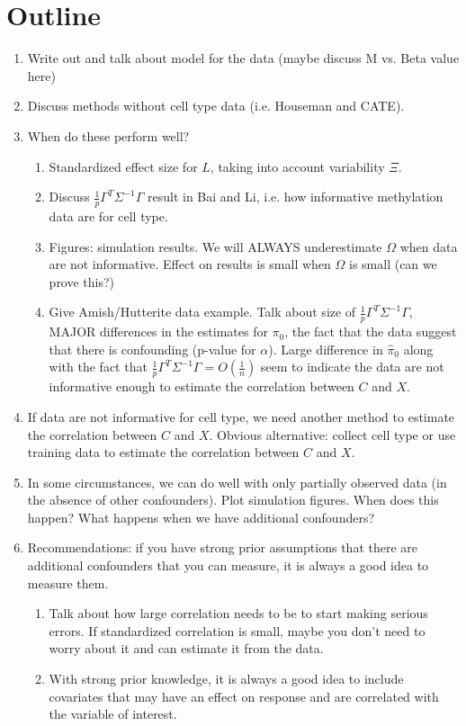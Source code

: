 \documentclass{article}
\begin{document}
\section*{Outline}
\begin{enumerate}
\item Write out and talk about model for the data (maybe discuss M vs. Beta value here)
\item Discuss methods without cell type data (i.e. Houseman and CATE).
\item When do these perform well?
	\begin{enumerate}
	\item Standardized effect size for $L$, taking into account variability $\Xi$.
	\item Discuss $\frac{1}{p}\Gamma^T \Sigma^{-1}\Gamma$ result in Bai and Li, i.e. how informative methylation data are for cell type.
	\item Figures: simulation results. We will ALWAYS underestimate $\Omega$ when data are not informative. Effect on results is small when $\Omega$ is small (can we prove this?)
	\item Give Amish/Hutterite data example. Talk about size of $\frac{1}{p}\Gamma^T \Sigma^{-1}\Gamma$, MAJOR differences in the estimates for $\pi_0$, the fact that the data suggest that there is confounding (p-value for $\alpha$). Large difference in $\hat{\pi}_0$ along with the fact that $\frac{1}{p}\Gamma^T \Sigma^{-1}\Gamma = O\left( \frac{1}{n} \right)$ seem to indicate the data are not informative enough to estimate the correlation between $C$ and $X$. 
	\end{enumerate}
\item If data are not informative for cell type, we need another method to estimate the correlation between $C$ and $X$. Obvious alternative: collect cell type or use training data to estimate the correlation between $C$ and $X$.
\item In some circumstances, we can do well with only partially observed data (in the absence of other confounders). Plot simulation figures. When does this happen? What happens when we have additional confounders?
\item Recommendations: if you have strong prior assumptions that there are additional confounders that you can measure, it is always a good idea to measure them.
	\begin{enumerate}
	\item Talk about how large correlation needs to be to start making serious errors. If standardized correlation is small, maybe you don't need to worry about it and can estimate it from the data.
	\item With strong prior knowledge, it is always a good idea to include covariates that may have an effect on response and are correlated with the variable of interest.
	\end{enumerate}
\end{enumerate}
\end{document}

